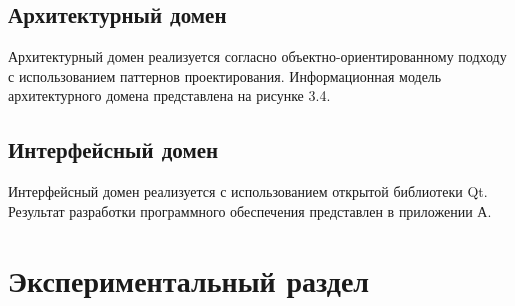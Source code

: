 \section{Архитектурный домен}

Архитектурный домен реализуется согласно объектно-ориентированному подходу с использованием паттернов проектирования. Информационная модель архитектурного домена представлена на рисунке 3.4.

\section{Интерфейсный домен}

Интерфейсный домен реализуется с использованием открытой библиотеки Qt. Результат разработки программного обеспечения представлен в приложении А.

\chapter{Экспериментальный раздел}
